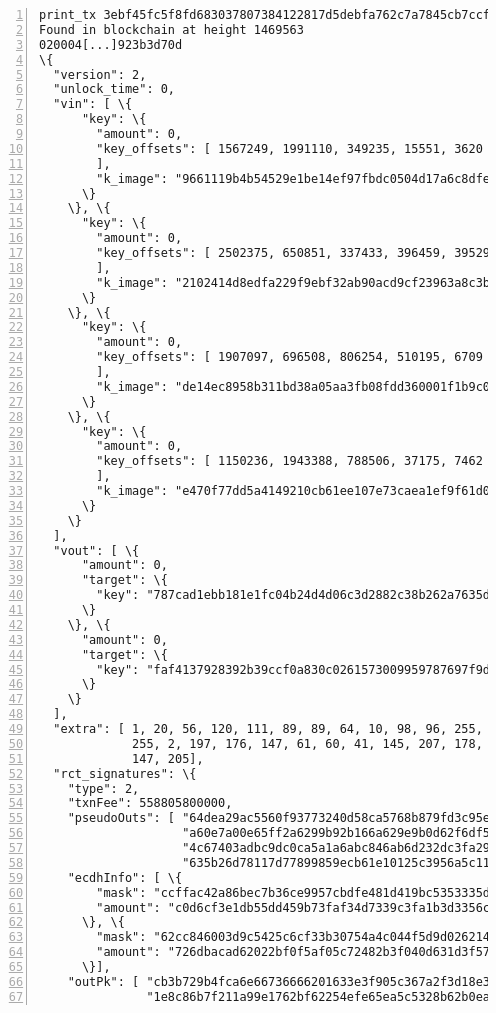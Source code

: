 \begin{appendices}
\begin{Verbatim}[commandchars=\\\{\}, numbers=left]
print_tx 3ebf45fc5f8fd683037807384122817d5debfa762c7a7845cb7ccfe9ee20940b 
Found in blockchain at height 1469563
020004[...]923b3d70d
\{
  "version": 2, 
  "unlock_time": 0, 
  "vin": [ \{
      "key": \{
        "amount": 0, 
        "key_offsets": [ 1567249, 1991110, 349235, 15551, 3620
        ], 
        "k_image": "9661119b4b54529e1be14ef97fbdc0504d17a6c8dfedd55d2455b93a6336bb41"
      \}
    \}, \{
      "key": \{
        "amount": 0, 
        "key_offsets": [ 2502375, 650851, 337433, 396459, 39529
        ], 
        "k_image": "2102414d8edfa229f9ebf32ab90acd9cf23963a8c3b6ba0e181fc1d5782c046c"
      \}
    \}, \{
      "key": \{
        "amount": 0, 
        "key_offsets": [ 1907097, 696508, 806254, 510195, 6709
        ], 
        "k_image": "de14ec8958b311bd38a05aa3fb08fdd360001f1b9c060264eecdd8c08c9e83c4"
      \}
    \}, \{
      "key": \{
        "amount": 0, 
        "key_offsets": [ 1150236, 1943388, 788506, 37175, 7462
        ], 
        "k_image": "e470f77dd5a4149210cb61ee107e73caea1ef9f61d05384e3bd4372fdc85bf17"
      \}
    \}
  ], 
  "vout": [ \{
      "amount": 0, 
      "target": \{
        "key": "787cad1ebb181e1fc04b24d4d06c3d2882c38b262a7635de8ad487c536e40a12"
      \}
    \}, \{
      "amount": 0, 
      "target": \{
        "key": "faf4137928392b39ccf0a830c0261573009959787697f9d4fb769c25781fb911"
      \}
    \}
  ], 
  "extra": [ 1, 20, 56, 120, 111, 89, 89, 64, 10, 98, 96, 255, 202, 235, 203, 
             255, 2, 197, 176, 147, 61, 60, 41, 145, 207, 178, 212, 71, 37, 69, 19, 
             147, 205], 
  "rct_signatures": \{
    "type": 2, 
    "txnFee": 558805800000, 
    "pseudoOuts": [ "64dea29ac5560f93773240d58ca5768b879fd3c95e0b3b50a80ec36a6ff3a6da",
                    "a60e7a00e65ff2a6299b92b166a629e9b0d62f6df50e40535140716757efe4c0", 
                    "4c67403adbc9dc0ca5a1a6abc846ab6d232dc3fa295099b3c7a9d005bac60eba", 
                    "635b26d78117d77899859ecb61e10125c3956a5c113b932f33c92c561acddaa3"], 
    "ecdhInfo": [ \{
        "mask": "ccffac42a86bec7b36ce9957cbdfe481d419bc5353335d0c236c347aea758d0c", 
        "amount": "c0d6cf3e1db55dd459b73faf34d7339c3fa1b3d3356cfb2adc3faf798264b00e"
      \}, \{
        "mask": "62cc846003d9c5425c6cf33b30754a4c044f5d9d02621460e45664b886673109", 
        "amount": "726dbacad62022bf0f5af05c72482b3f040d631d3f576b5e2615ea72f84c5f06"
      \}], 
    "outPk": [ "cb3b729b4fca6e66736666201633e3f905c367a2f3d18e31fe3d3c18d2be93fd", 
               "1e8c86b7f211a99e1762bf62254efe65ea5c5328b62b0ea8d679b2e52800f633"]

\end{Verbatim}
\end{appendices}
